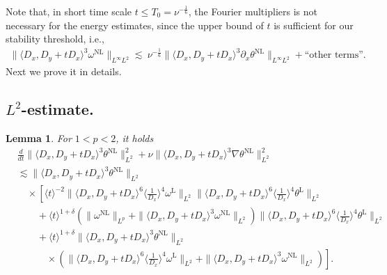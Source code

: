 \documentclass[reqno, 12pt]{amsart} %
\theoremstyle{plain} %
\newtheorem{Lem}[Thm]{Lemma}     %
\theoremstyle{definition}
\theoremstyle{remark}
\numberwithin{equation}{section} %
\newcommand{\lt}{\left}
\newcommand{\rt}{\right}
\newcommand{\px}{\partial_x}
\begin{document}
	
	Note that, in short time scale $t\leq T_0 = \nu^{-\frac16}$, the  Fourier multipliers is not necessary  for the energy estimates, since the upper bound of $t$ is sufficient for our stability threshold, i.e.,  
	\begin{equation*}
		\begin{aligned}
			\|\langle D_x, D_y+t D_x\rangle^3 \omega^{\mathrm{NL}}\|_{L^\infty L^2}  \lesssim  \  \nu^{-\frac16} \|\langle D_x, D_y+t D_x\rangle^3 \px \theta^{\mathrm{NL}}\|_{L^\infty L^2} + \text{``other terms''.}
		\end{aligned}
	\end{equation*}
    Next we prove it in details.
	
	\subsection{$L^2$-estimate.}
	\begin{Lem} \label{eq:est of theta NL short time}
		For $1<p<2$, it holds
		$$
		\begin{aligned}
			& \frac{d}{d t}\|\langle D_x, D_y+t D_x\rangle^3 \theta^{\mathrm{NL}}\|_{L^2}^2 + \nu \|\langle D_x, D_y+t D_x\rangle^3 \nabla \theta^{\mathrm{NL}}\|_{L^2}^2 \\
			&\lesssim\|\langle D_x, D_y+t D_x\rangle^3 \theta^{\mathrm{NL}}\|_{L^2} \\
			&\quad \times  \left[\langle t\rangle^{-2} \|\langle D_x, D_y+t D_x\rangle^6\langle\frac{1}{D_x}\rangle^4 \omega^{\mathrm{L}}\|_{L^2}
			\|\langle D_x, D_y+t D_x\rangle^6\langle\frac{1}{D_x}\rangle^4 \theta^{\mathrm{L}}\|_{L^2} \rt.\\
			&\lt.\quad \quad +\langle t\rangle^{1+\delta}  \left(\|\omega^{\mathrm{NL}}\|_{L^p}+\|\langle D_x, D_y+t D_x\rangle^3 \omega^{\mathrm{NL}}\|_{L^2}\right) 
			\|\langle D_x, D_y+t D_x\rangle^6\langle\frac{1}{D_x}\rangle^4 \theta^{\mathrm{L}}\|_{L^2} \rt.  \\
			& \left.\quad \quad  + \langle t\rangle^{1+\delta}\|\langle D_x, D_y+t D_x\rangle^3 \theta^{\mathrm{NL}}\|_{L^2} \rt. \\
			&\lt.   \qquad \quad \times \left(\|\langle D_x, D_y+t D_x\rangle^6\langle\frac{1}{D_x}\rangle^4 \omega^{\mathrm{L}}\|_{L^2}  + \|\langle D_x, D_y+t D_x\rangle^3 \omega^{\mathrm{NL}}\|_{L^2} \right) \right].
		\end{aligned}
		$$
	\end{Lem}
\end{document}
